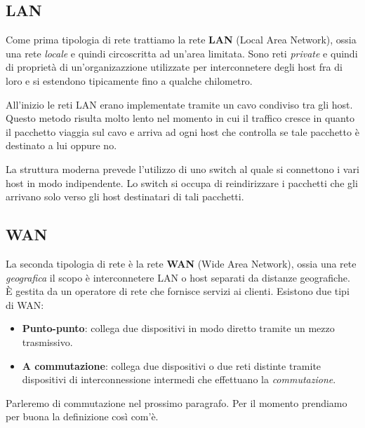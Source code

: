 \subsection{LAN}
Come prima tipologia di rete trattiamo la rete \textbf{LAN} (Local Area Network), ossia una rete
\emph{locale} e quindi circoscritta ad un'area limitata. Sono reti \emph{private} e quindi di
proprietà di un'organizazzione utilizzate per interconnetere degli host fra di loro e si estendono
tipicamente fino a qualche chilometro.

All'inizio le reti LAN erano implementate tramite un cavo condiviso tra gli host. Questo metodo 
risulta molto lento nel momento in cui il traffico cresce in quanto il pacchetto viaggia sul cavo
e arriva ad ogni host che controlla se tale pacchetto è destinato a lui oppure no.

La struttura moderna prevede l'utilizzo di uno switch al quale si connettono i vari host in modo 
indipendente. Lo switch si occupa di reindirizzare i pacchetti che gli arrivano solo verso gli 
host destinatari di tali pacchetti.

\subsection{WAN}
La seconda tipologia di rete è la rete \textbf{WAN} (Wide Area Network), ossia una rete
\emph{geografica} il scopo è interconnetere LAN o host separati da distanze geografiche. \`E
gestita da un operatore di rete che fornisce servizi ai clienti. Esistono due tipi di WAN:
\begin{itemize}
	\item \textbf{Punto-punto}: collega due dispositivi in modo diretto tramite un mezzo
		trasmissivo.
	\item \textbf{A commutazione}: collega due dispositivi o due reti distinte tramite dispositivi
		di interconnessione intermedi che effettuano la \emph{commutazione}.
\end{itemize}
Parleremo di commutazione nel prossimo paragrafo. Per il momento prendiamo per buona la
definizione così com'è.


